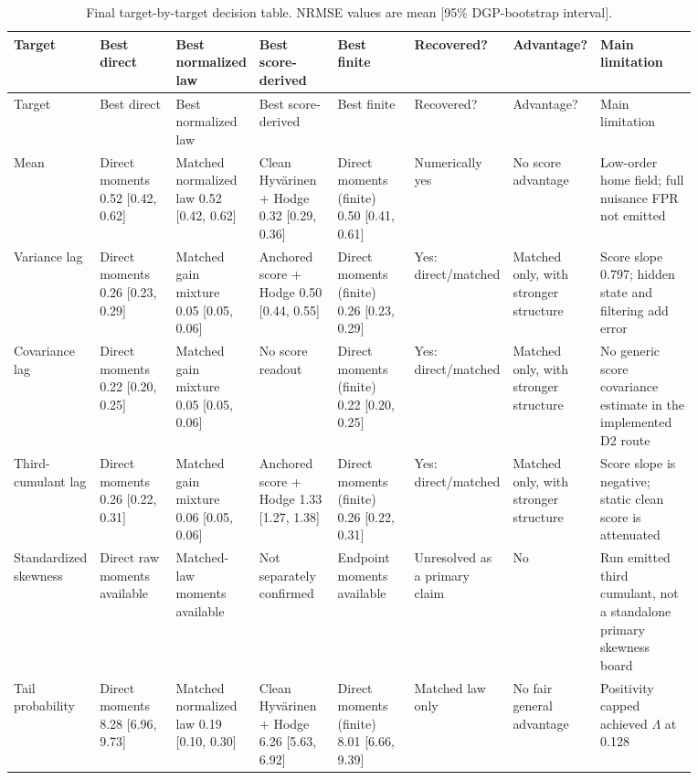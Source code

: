 \begin{landscape}\scriptsize\begin{longtable}{p{0.08\linewidth}p{0.12\linewidth}p{0.12\linewidth}p{0.12\linewidth}p{0.12\linewidth}p{0.08\linewidth}p{0.08\linewidth}p{0.15\linewidth}}
\caption{Final target-by-target decision table. NRMSE values are mean [95\% DGP-bootstrap interval].}\\
\toprule Target & Best direct & Best normalized law & Best score-derived & Best finite & Recovered? & Advantage? & Main limitation\\\midrule
\endfirsthead\toprule Target & Best direct & Best normalized law & Best score-derived & Best finite & Recovered? & Advantage? & Main limitation\\\midrule\endhead
Mean & Direct moments 0.52 [0.42, 0.62] & Matched normalized law 0.52 [0.42, 0.62] & Clean Hyv\"arinen + Hodge 0.32 [0.29, 0.36] & Direct moments (finite) 0.50 [0.41, 0.61] & Numerically yes & No score advantage & Low-order home field; full nuisance FPR not emitted \\
Variance lag & Direct moments 0.26 [0.23, 0.29] & Matched gain mixture 0.05 [0.05, 0.06] & Anchored score + Hodge 0.50 [0.44, 0.55] & Direct moments (finite) 0.26 [0.23, 0.29] & Yes: direct/matched & Matched only, with stronger structure & Score slope 0.797; hidden state and filtering add error \\
Covariance lag & Direct moments 0.22 [0.20, 0.25] & Matched gain mixture 0.05 [0.05, 0.06] & No score readout & Direct moments (finite) 0.22 [0.20, 0.25] & Yes: direct/matched & Matched only, with stronger structure & No generic score covariance estimate in the implemented D2 route \\
Third-cumulant lag & Direct moments 0.26 [0.22, 0.31] & Matched gain mixture 0.06 [0.05, 0.06] & Anchored score + Hodge 1.33 [1.27, 1.38] & Direct moments (finite) 0.26 [0.22, 0.31] & Yes: direct/matched & Matched only, with stronger structure & Score slope is negative; static clean score is attenuated \\
Standardized skewness & Direct raw moments available & Matched-law moments available & Not separately confirmed & Endpoint moments available & Unresolved as a primary claim & No & Run emitted third cumulant, not a standalone primary skewness board \\
Tail probability & Direct moments 8.28 [6.96, 9.73] & Matched normalized law 0.19 [0.10, 0.30] & Clean Hyv\"arinen + Hodge 6.26 [5.63, 6.92] & Direct moments (finite) 8.01 [6.66, 9.39] & Matched law only & No fair general advantage & Positivity capped achieved $\Lambda$ at 0.128 \\

\end{longtable}
\end{landscape}
